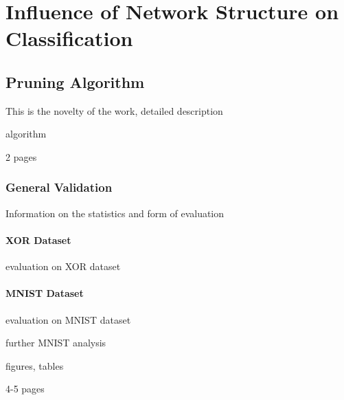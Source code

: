 \chapter{Influence of Network Structure on Classification}
\label{chapter:influence_of_network_structure}

\section{Pruning Algorithm}
This is the novelty of the work, detailed description

algorithm

2 pages

\subsection{General Validation}
Information on the statistics and form of evaluation

\subsubsection*{XOR Dataset}
evaluation on XOR dataset

\subsubsection*{MNIST Dataset}
evaluation on MNIST dataset

further MNIST analysis

figures, tables

4-5 pages